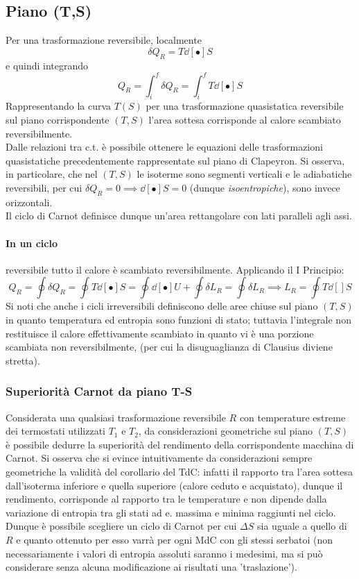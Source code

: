 \documentclass[10pt, oneside]{book}
\begin{document}
\subsection{Piano (T,S)}
Per una trasformazione reversibile, localmente
\[\delta Q_R = T \dd[•]{S}\]
e quindi integrando
\[Q_R = \int_i^f \delta Q_R = \int_i^f T \dd[•]{S}\]
Rappresentando la curva $T(S)$ per una trasformazione quasistatica reversibile sul piano corrispondente $(T,S)$ l'area sottesa corrisponde al calore scambiato reversibilmente.\\
Dalle relazioni tra c.t. è possibile ottenere le equazioni delle trasformazioni quasistatiche precedentemente rappresentate sul piano di Clapeyron. Si osserva, in particolare, che nel $(T,S)$ le isoterme sono segmenti verticali e le adiabatiche reversibili, per cui $\delta Q_R = 0 \implies \dd[•]{S} = 0$ (dunque \textit{isoentropiche}), sono invece orizzontali.\\
Il ciclo di Carnot definisce dunque un'area rettangolare con lati paralleli agli assi.\\
\paragraph{In un ciclo} reversibile tutto il calore è scambiato reversibilmente. Applicando il I Principio:
\[Q_R = \oint \delta Q_R = \oint T\dd[•]{S} = \oint \dd[•]{U} + \oint \delta L_R = \oint \delta L_R \implies L_R = \oint T \dd[]{S}\]
Si noti che anche i cicli irreversibili definiscono delle aree chiuse sul piano $(T,S)$ in quanto temperatura ed entropia sono funzioni di stato; tuttavia l'integrale non restituisce il calore effettivamente scambiato in quanto vi è una porzione scambiata non reversibilmente, (per cui la disuguaglianza di Clausius diviene stretta).

\subsubsection{Superiorità Carnot da piano T-S}
Considerata una qualsiasi trasformazione reversibile $R$ con temperature estreme dei termostati utilizzati $T_1$ e $T_2$, da considerazioni geometriche sul piano $(T,S)$ è possibile dedurre la superiorità del rendimento della corrispondente macchina di Carnot. Si osserva che si evince intuitivamente da considerazioni sempre geometriche la validità del corollario del TdC: infatti il rapporto tra l'area sottesa dall'isoterma inferiore e quella superiore (calore ceduto e acquistato), dunque il rendimento, corrisponde al rapporto tra le temperature e non dipende dalla variazione di entropia tra gli stati ad e. massima e minima raggiunti nel ciclo. Dunque è possibile scegliere un ciclo di Carnot per cui $\Delta S$ sia uguale a quello di $R$ e quanto ottenuto per esso varrà per ogni MdC con gli stessi serbatoi (non necessariamente i valori di entropia assoluti saranno i medesimi, ma si può considerare senza alcuna modificazione ai risultati una 'traslazione').\\
\end{document}
